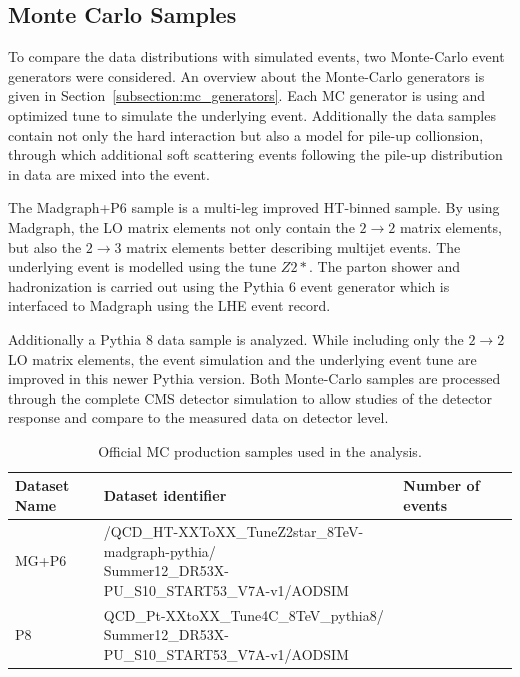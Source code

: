 \subsection{Monte Carlo Samples}

To compare the data distributions with simulated events, two Monte-Carlo event
generators were considered. An overview about the Monte-Carlo generators is
given in Section~\ref{subsection:mc_generators}. Each MC generator is using and
optimized tune to simulate the underlying event. Additionally the data samples
contain not only the hard interaction but also a model for pile-up collionsion,
through which additional soft scattering events following the pile-up
distribution in data are mixed into the event.

The Madgraph+P6 sample is a multi-leg improved HT-binned sample. By using
Madgraph, the LO matrix elements not only contain the $2 \rightarrow 2$ matrix
elements, but also the $2 \rightarrow 3$ matrix elements better describing
multijet events. The underlying event is modelled using the tune $Z2*$. The
parton shower and hadronization is carried out using the Pythia 6 event
generator which is interfaced to Madgraph using the LHE event record.

Additionally a Pythia 8 data sample is analyzed. While including only the $2
\rightarrow 2$ LO matrix elements, the event simulation and the underlying event
tune are improved in this newer Pythia version. Both Monte-Carlo samples are
processed through the complete CMS detector simulation to allow studies of the
detector response and compare to the measured data on detector level. 

\begin{table}[htp]
    \centering
    \caption[Monte Carlo datasets]{Official MC production samples used in the analysis.}
    \label{tab:montecarlo:datasets}
    \begin{tabular}{llll}
    \toprule
    Dataset Name & Dataset identifier & Number of events\\\midrule
    MG+P6 &
    \makecell{/QCD\_HT-XXToXX\_TuneZ2star\_8TeV-madgraph-pythia/\\ Summer12\_DR53X-PU\_S10\_START53\_V7A-v1/AODSIM} & \\
    P8 & \makecell{QCD\_Pt-XXtoXX\_Tune4C\_8TeV\_pythia8/\\
    Summer12\_DR53X-PU\_S10\_START53\_V7A-v1/AODSIM} & \\
    \bottomrule
    \end{tabular}
\end{table}

